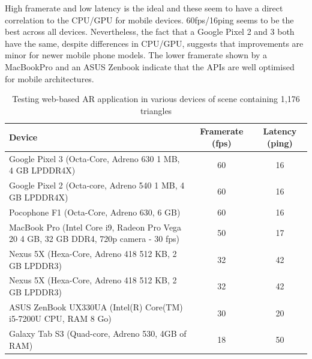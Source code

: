 \documentclass[acmlarge,screen,dvipsnames]{acmart}
\begin{document}
High framerate and low latency is the ideal and these seem to have a direct
correlation to the CPU/GPU for mobile devices. 60fps/16ping seems to be the
best across all devices. Nevertheless, the fact that a Google Pixel 2 and 3 both
have the same, despite differences in CPU/GPU, suggests that improvements are minor
for newer mobile phone models. The lower framerate shown by a MacBookPro
and an ASUS Zenbook indicate that the APIs are well optimised for mobile
architectures.


\begin{table}[h] \centering 
\begin{tabular}{|>{\arraybackslash}p{8cm}|c|c|} 
\hline 
Device & Framerate (fps) & Latency (ping)\\  
\hline \hline 
Google Pixel 3 (Octa-Core, Adreno 630 1 MB, 4 GB LPDDR4X) &  60 & 16\\ 
\hline
 Google Pixel 2 (Octa-core,
Adreno 540 1 MB, 4 GB LPDDR4X)  &  60 & 16\\ 
\hline
Pocophone F1 (Octa-Core, Adreno 630, 6 GB) & 60 & 16 \\ 
\hline 
MacBook Pro
(Intel Core i9, Radeon Pro Vega 20 4 GB, 32 GB DDR4, 720p camera - 30 fps)  &
50 & 17\\ 
\hline 
Nexus 5X (Hexa-Core, Adreno 418 512 KB, 2 GB LPDDR3) & 32 &
42 \\ 
\hline  
Nexus 5X (Hexa-Core, Adreno 418 512 KB, 2 GB LPDDR3) & 32 & 42
\\ 
\hline 
ASUS ZenBook UX330UA (Intel(R) Core(TM) i5-7200U CPU, RAM 8 Go) & 30
& 20\\ 
\hline 
Galaxy Tab S3 (Quad-core, Adreno 530, 4GB of RAM) & 18 & 50\\
\hline 
\end{tabular} 
 \caption{Testing web-based AR application in various
devices of scene containing 1,176 triangles} \label{table:framerates} 
\end{table}




\end{document}
